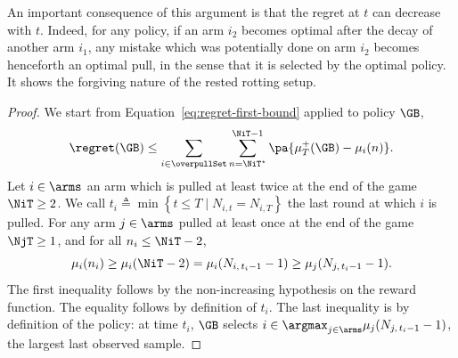 \begin{remark}
An important consequence of this argument is that the regret at $t$ can decrease with $t$. Indeed, for any policy, if an arm $i_2$ becomes optimal after the decay of another arm $i_1$, any mistake which was potentially done on arm $i_2$ becomes henceforth an optimal pull, in the sense that it is selected by the optimal policy. It shows the forgiving nature of the rested rotting setup. 
\end{remark}
\begin{proof}
We start from Equation~\ref{eq:regret-first-bound} applied to policy $\GB$,
\begin{equation}
\label{eq:regret-first-bound-GB}
\regret(\GB) \leq \sum_{i\in \overpullSet}   \sum_{n=\NiT^\star}^{\NiT-1} \pa{\mu^+_T(\GB) - \mu_i(n)}.
\end{equation}
%
Let $i \in \arms$ an arm which is pulled at least twice at the end of the game $\NiT \geq 2$. We call $t_i \triangleq \min\left\{t\leq T\; |\; N_{i,t} = N_{i,T}\right\}$ the last round at which $i$ is pulled. For any arm  $j \in \arms$ pulled at least once at the end of the game $\NjT \geq 1$, and for all $n_i \leq \NiT -2$, 
\begin{equation}
\label{eq:overpull-GB1}
\mu_i(n_i) \geq \mu_i(\NiT - 2 ) = \mu_i(N_{i,\,t_i -1} - 1 ) \geq \mu_j(N_{j,\,t_i-1} - 1).
\end{equation}
The first inequality follows by the non-increasing hypothesis on the reward function. The equality follows by definition of $t_i$. The last inequality is by definition of the policy: at time $t_i$, $\GB$ selects $i \in \argmax_{j \in \arms} \mu_j(N_{j,\,t_i-1}-1)$, the largest last observed sample. 


\end{proof}

